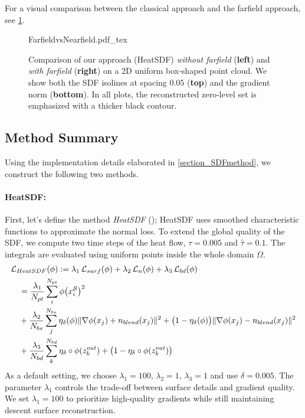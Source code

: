 \documentclass[12pt,openany]{book}
\def\S{\mathcal{S}}
\theoremstyle{plainnormal}
\theoremstyle{remark}
\begin{document}
For a visual comparison between the classical approach and the farfield approach, see \cref{farfield_comp}.
\begin{figure}
    \centering
    \begingroup
    \sffamily  %
    \def\svgwidth{\textwidth}
    {FarfieldvsNearfield.pdf_tex}
    \endgroup
    \caption{Comparison of our approach (HeatSDF) \emph{without farfield} (\textbf{left}) and \emph{with farfield} (\textbf{right}) on a 2D uniform box-shaped point cloud. We show both the SDF isolines at spacing 0.05 (\textbf{top}) and the gradient norm (\textbf{bottom}). In all plots, the reconstructed zero-level set is emphasized with a thicker black contour.}\label{farfield_comp}
\end{figure}
\subsection{Method Summary}\label{ch:methodsummary} Using the implementation details elaborated in \cref{section_SDFmethod}, we construct the following two methods.
\paragraph{HeatSDF:} First, let's define the method \emph{HeatSDF} (\cite{weidemaier2025sdfsunorientedpointclouds}); HeatSDF uses smoothed characteristic functions to approximate the normal loss. To extend the global quality of the SDF, we compute two time steps of the heat flow, $\tau = 0.005$ and $\hat \tau = 0.1 $. The integrals are evaluated using uniform points inside the whole domain $\Omega$.
\begin{align}
    &\mathcal{L}_{HeatSDF}(\phi) := \lambda_1\, \mathcal{L}_{surf}(\phi) + \lambda _2\,\mathcal{L}_{n}(\phi) + \lambda_3\,\mathcal{L}_{bd}(\phi)\notag \\
    &\quad =\frac{\lambda_1}{N_{pt}}\sum_i^{N_{pt}}\phi\big( x_i^\S\big)^2
     \notag\\\notag & \quad + \frac{\lambda_2}{N_{bs}}\sum_j^{N_{bs}}
\eta_\delta(\phi) \|\nabla \phi(x_j) + n_{blend}(x_j)\|^2 + \big(1 - \eta_\delta(\phi)\big) \|\nabla \phi(x_j) - n_{blend}(x_j)\|^2 \notag\\ & \quad+ \frac{\lambda_3}{N_{bd}} \sum_k^{N_{bd}} \eta_\delta\circ\phi(z_k^{out}) +\big(1-\eta_\delta\circ\phi(z_k^{out})\big) 
\end{align}
As a default setting, we choose $\lambda_1 = 100, \,\lambda_2 = 1, \,\lambda_3 = 1$ and use $\delta = 0.005$. The parameter $\lambda_1$ controls the trade-off between surface details and gradient quality. We set $\lambda_1 = 100$ to prioritize high-quality gradients while still maintaining descent surface reconstruction.
\end{document}
